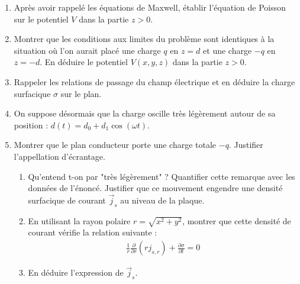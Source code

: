 \begin{enumerate}

	\item Après avoir rappelé les équations de Maxwell, établir l'équation de Poisson sur le potentiel $V$ dans la partie $z>0$.
	
	\item Montrer que les conditions aux limites du problème sont identiques à la situation où l'on aurait placé une charge $q$ en $z=d$ et une charge $-q$ en $z=-d$. En déduire le potentiel $V(x,y,z)$ dans la partie $z>0$.
	
	\item Rappeler les relations de passage du champ électrique et en déduire la charge surfacique $\sigma$ sur le plan.
	
	\item On suppose désormais que la charge oscille très légèrement autour de sa position : $d(t)=d_0+d_1\cos(\omega t)$. 
	
	\item Montrer que le plan conducteur porte une charge totale $-q$. Justifier l'appellation d'écrantage.
	
	\begin{enumerate}
	
		\item Qu'entend t-on par "très légèrement" ? Quantifier cette remarque avec les données de l'énoncé. Justifier que ce mouvement engendre une densité surfacique de courant $\vec{j}_s$ au niveau de la plaque.
		
		\item En utilisant la rayon polaire $r=\sqrt{x^2+y^2}$, montrer que cette densité de courant vérifie la relation suivante :
		\begin{align*}
			\frac{1}{r}\frac{\partial}{\partial r}\left(r j_{s,r} \right) +\frac{\partial \sigma}{\partial t}=0
		\end{align*}
		
		\item En déduire l'expression de $\vec{j}_s$.
	
	\end{enumerate}
	 
\end{enumerate}

\newpage


